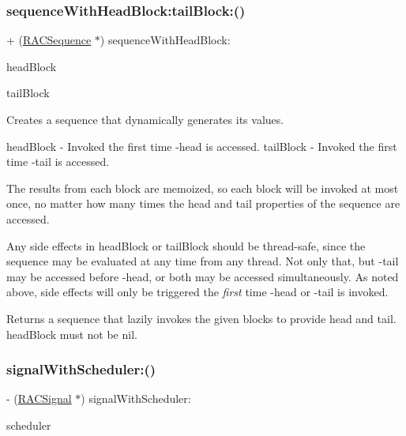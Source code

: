 \subsubsection{\texorpdfstring{sequence\+With\+Head\+Block\+:tail\+Block\+:()}{sequenceWithHeadBlock:tailBlock:()}\hspace{0.1cm}{\footnotesize\ttfamily [3/3]}}
{\footnotesize\ttfamily + (\mbox{\hyperlink{interface_r_a_c_sequence}{R\+A\+C\+Sequence}} $\ast$) sequence\+With\+Head\+Block\+: \begin{DoxyParamCaption}\item[{(id($^\wedge$)(void))}]{head\+Block }\item[{tailBlock:(\mbox{\hyperlink{interface_r_a_c_sequence}{R\+A\+C\+Sequence}} $\ast$($^\wedge$)(void))}]{tail\+Block }\end{DoxyParamCaption}}

Creates a sequence that dynamically generates its values.

head\+Block -\/ Invoked the first time -\/head is accessed. tail\+Block -\/ Invoked the first time -\/tail is accessed.

The results from each block are memoized, so each block will be invoked at most once, no matter how many times the head and tail properties of the sequence are accessed.

Any side effects in {\ttfamily head\+Block} or {\ttfamily tail\+Block} should be thread-\/safe, since the sequence may be evaluated at any time from any thread. Not only that, but -\/tail may be accessed before -\/head, or both may be accessed simultaneously. As noted above, side effects will only be triggered the {\itshape first} time -\/head or -\/tail is invoked.

Returns a sequence that lazily invokes the given blocks to provide head and tail. {\ttfamily head\+Block} must not be nil. \mbox{\label{interface_r_a_c_sequence_ac2b08c9ed5f9cae5c96f61578e9c3f5d}} 
\subsubsection{\texorpdfstring{signal\+With\+Scheduler\+:()}{signalWithScheduler:()}\hspace{0.1cm}{\footnotesize\ttfamily [1/3]}}
{\footnotesize\ttfamily -\/ (\mbox{\hyperlink{interface_r_a_c_signal}{R\+A\+C\+Signal}} $\ast$) signal\+With\+Scheduler\+: \begin{DoxyParamCaption}\item[{(\mbox{\hyperlink{interface_r_a_c_scheduler}{R\+A\+C\+Scheduler}} $\ast$)}]{scheduler }\end{DoxyParamCaption}}

